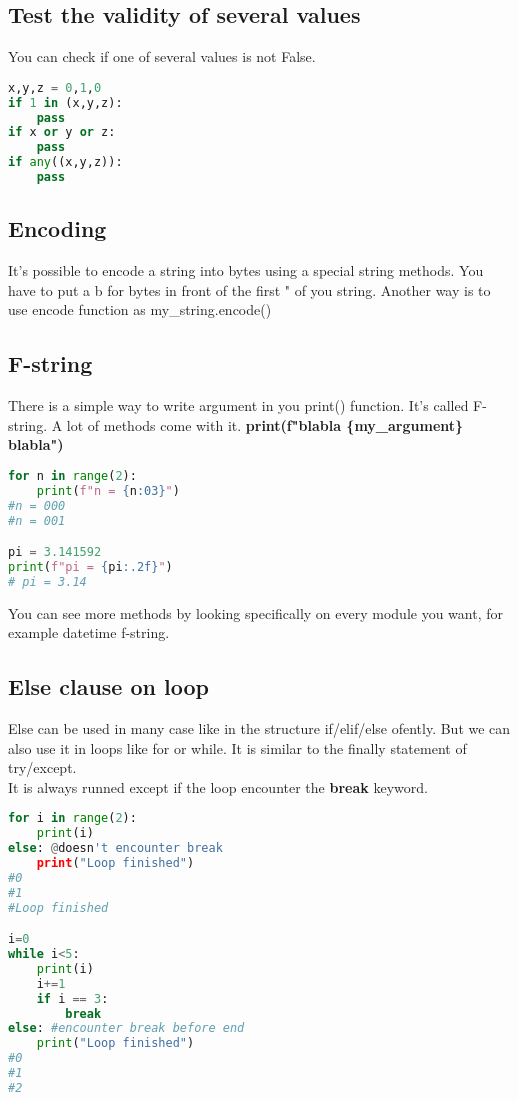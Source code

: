 \documentclass[a4paper, 12pt, titlepage]{scrartcl} %
\begin{document}
\subsection{Test the validity of several values}
You can check if one of several values is not False.
\begin{lstlisting}[language=Python]
x,y,z = 0,1,0
if 1 in (x,y,z):
    pass
if x or y or z:
    pass
if any((x,y,z)):
    pass
\end{lstlisting}

\subsection{Encoding}
It's possible to encode a string into bytes using a special string methods. You have to put a b for bytes in front of the first " of you string. Another way is to use encode function as my\_string.encode()

\subsection{F-string}
\label{subsec:F-string}
There is a simple way to write argument in you print() function. It's called F-string. A lot of methods come with it. \textbf{print(f"blabla \{my\_argument\} blabla")}
\begin{lstlisting}[language=Python]
for n in range(2):
	print(f"n = {n:03}")
#n = 000
#n = 001

pi = 3.141592
print(f"pi = {pi:.2f}") 
# pi = 3.14
\end{lstlisting}

You can see more methods by looking specifically on every module you want, for example datetime f-string.

\subsection{Else clause on loop}
Else can be used in many case like in the structure if/elif/else ofently. But we can also use it in loops like for or while. It is similar to the finally statement of try/except. \\
It is always runned except if the loop encounter the \textbf{break} keyword.

\begin{lstlisting}[language=Python]
for i in range(2):
    print(i)
else: @doesn't encounter break
    print("Loop finished")
#0
#1
#Loop finished

i=0
while i<5:
    print(i)
    i+=1
    if i == 3:
        break
else: #encounter break before end
    print("Loop finished")
#0
#1
#2
\end{lstlisting}
\end{document}
